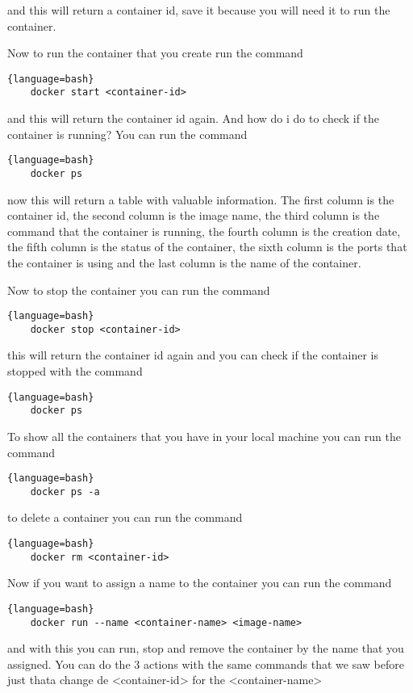 \documentclass{article}
\begin{document}
and this will return a container id, save it because you will need it to run the container.

Now to run the container that you create run the command
\begin{lstlisting}{language=bash}
    docker start <container-id>
\end{lstlisting}
and this will return the container id again. And how do i do to check if the container is running? You can run the command
\begin{lstlisting}{language=bash}
    docker ps
\end{lstlisting}

now this will return a table with valuable information. The first column is the container id,
the second column is the image name, the third column is the command that the container is running, 
the fourth column is the creation date, the fifth column is the status of the container, 
the sixth column is the ports that the container is using and the last column is the name of the container.

Now to stop the container you can run the command
\begin{lstlisting}{language=bash}
    docker stop <container-id>
\end{lstlisting} 
this will return the container id again and you can check if the container is stopped with the command
\begin{lstlisting}{language=bash}
    docker ps 
\end{lstlisting}

To show all the containers that you have in your local machine you can run the command
\begin{lstlisting}{language=bash}
    docker ps -a
\end{lstlisting}

to delete a container you can run the command
\begin{lstlisting}{language=bash}
    docker rm <container-id>
\end{lstlisting}

Now if you want to assign a name to the container you can run the command
\begin{lstlisting}{language=bash}
    docker run --name <container-name> <image-name>
\end{lstlisting}

 and with this you can run, stop and remove the container by the name that you assigned. You can do the 3 actions with 
 the same commands that we saw before just thata change de <container-id> for the <container-name>
\end{document}
